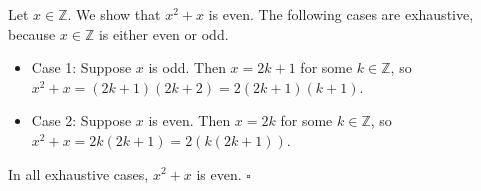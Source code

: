 Let $x \in \mathbb{Z}$.
We show that $x^{2} + x$ is even.
The following cases are exhaustive, because $x \in \mathbb{Z}$ is either even or odd.

\begin{itemize}
  \item Case 1: Suppose $x$ is odd.
    Then $x = 2k + 1$ for some $k \in \mathbb{Z}$, so $x^{2} + x = (2k + 1)(2k + 2) = 2(2k + 1)(k + 1)$.
  \item Case 2: Suppose $x$ is even.
    Then $x = 2k$ for some $k \in \mathbb{Z}$, so $x^{2} + x = 2k(2k + 1) = 2(k(2k + 1))$.
\end{itemize}

In all exhaustive cases, $x^{2} + x$ is even. \hfill$\square$